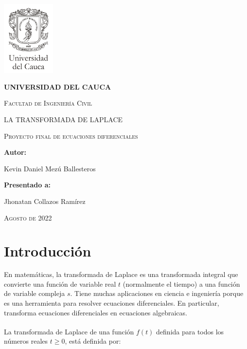 \documentclass[12pt,a4paper,twoside,onecolumn,openany]{book}
\begin{document}
\begin{titlepage}
\centering
{\includegraphics[width=0.2\textwidth]{Logo Unicauca}\par}
\vspace{1cm}
{\bfseries\LARGE UNIVERSIDAD DEL CAUCA\par}
\vspace{1cm}
{\scshape\Large Facultad de Ingeniería Civil\par}
\vspace{3cm}
{\scshape\Huge LA TRANSFORMADA DE LAPLACE\par}
\vspace{1cm}
{\scshape\Large Proyecto final de ecuaciones diferenciales\par}
\vspace{1cm}
{\Large \textbf{Autor:} \par}
{\Large Kevin Daniel Mezú Ballesteros\par}
\vfill
{\Large \textbf{Presentado a:} \par}
{\Large Jhonatan Collazos Ramírez\par}
\vspace{1cm}
{\scshape\Large Agosto de 2022 \par}
\end{titlepage}
\tableofcontents
\chapter{Introducción}
En matemáticas, la transformada de Laplace es una transformada integral que convierte una función de variable real $t$ (normalmente el tiempo) a una función de variable compleja $s$. Tiene muchas aplicaciones en ciencia e ingeniería porque es una herramienta para resolver ecuaciones diferenciales. En particular, transforma ecuaciones diferenciales en ecuaciones algebraicas.
\\
\\
La transformada de Laplace de una función $f(t)$ definida para todos los números reales $t\geq 0$, está  definida por:
\end{document}

